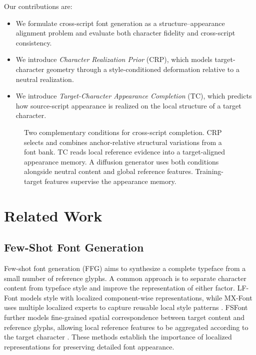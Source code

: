\documentclass{article}
\begin{document}
Our contributions are:
\begin{itemize}
    \item We formulate cross-script font generation as a structure--appearance alignment problem and evaluate both character fidelity and cross-script consistency.
    \item We introduce \emph{Character Realization Prior} (CRP), which models target-character geometry through a style-conditioned deformation relative to a neutral realization.
    \item We introduce \emph{Target-Character Appearance Completion} (TC), which predicts how source-script appearance is realized on the local structure of a target character.
\end{itemize}

\begin{figure}[t]
\centering

\caption{Two complementary conditions for cross-script completion. CRP selects and combines anchor-relative structural variations from a font bank. TC reads local reference evidence into a target-aligned appearance memory. A diffusion generator uses both conditions alongside neutral content and global reference features. Training-target features supervise the appearance memory.}
\label{fig:overview}
\end{figure}

\section{Related Work}
\label{sec:related}

\subsection{Few-Shot Font Generation}

Few-shot font generation (FFG) aims to synthesize a complete typeface from a small number of reference glyphs.
A common approach is to separate character content from typeface style and improve the representation of either factor.
LF-Font models style with localized component-wise representations, while MX-Font uses multiple localized experts to capture reusable local style patterns
\citep{park2021lffont,park2021mxfont}.
FSFont further models fine-grained spatial correspondence between target content and reference glyphs, allowing local reference features to be aggregated according to the target character
\citep{tang2022fsfont}.
These methods establish the importance of localized representations for preserving detailed font appearance.
\end{document}

